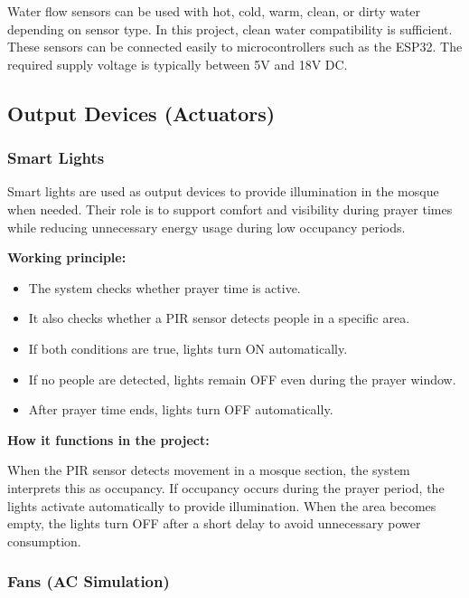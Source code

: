 Water flow sensors can be used with hot, cold, warm, clean, or dirty water depending on sensor type. In this project, clean water compatibility is sufficient. These sensors can be connected easily to microcontrollers such as the ESP32. The required supply voltage is typically between 5V and 18V DC.


\subsection{Output Devices (Actuators)}

\subsubsection{Smart Lights}

Smart lights are used as output devices to provide illumination in the mosque when needed. Their role is to support comfort and visibility during prayer times while reducing unnecessary energy usage during low occupancy periods.

\textbf{Working principle:}
\begin{itemize}
    \item The system checks whether prayer time is active.
    \item It also checks whether a PIR sensor detects people in a specific area.
    \item If both conditions are true, lights turn ON automatically.
    \item If no people are detected, lights remain OFF even during the prayer window.
    \item After prayer time ends, lights turn OFF automatically.
\end{itemize}

\textbf{How it functions in the project:}

When the PIR sensor detects movement in a mosque section, the system interprets this as occupancy. If occupancy occurs during the prayer period, the lights activate automatically to provide illumination. When the area becomes empty, the lights turn OFF after a short delay to avoid unnecessary power consumption.


\subsubsection{Fans (AC Simulation)}

